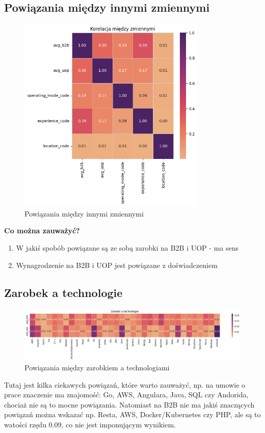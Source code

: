 \documentclass{article}
\begin{document}
\subsection{Powiązania między innymi zmiennymi}

\begin{figure}[H]
    \centering
    \includegraphics[width=0.8\textwidth]{../analysis/plots/korelacje/inne_zmienne.png}
    \caption{Powiązania między innymi zmiennymi}
\end{figure}

\quad \textbf{Co można zauważyć?}

\begin{enumerate}
    \item W jakiś spobób powiązane są ze sobą zarobki na B2B i UOP - ma sens
    \item Wynagrodzenie na B2B i UOP jest powiązane z doświadczeniem
\end{enumerate}


\subsection{Zarobek a technologie}

\begin{figure}[H]
    \centering
    \includegraphics[width=\textwidth]{../analysis/plots/korelacje/zarobki_a_technologie.png}
    \caption{Powiązania między zarobkiem a technologiami}
\end{figure}

\quad Tutaj jest kilka ciekawych powiązań, które warto zauważyć, np. na umowie o prace znaczenie ma
znajomość: Go, AWS, Angulara, Java, SQL czy Andorida, chociaż nie są to mocne powiązania. Natomiast na B2B nie ma jakiś znaczących powiązań można wskazać
np. Resta, AWS, Docker/Kubernetes czy PHP, ale są to watości rzędu 0.09, co nie jest imponującym wynikiem.
\end{document}
